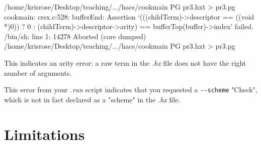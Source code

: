 \documentclass[11pt]{article} %
\begin{document}
\begin{error}[]\leavevmode
\begin{code}
/home/krisrose/Desktop/teaching/.../hacs/cookmain PG pr3.hxt > pr3.pg
cookmain: crsx.c:528: bufferEnd: Assertion
   `(((childTerm)->descriptor == ((void *)0)) ? 0 :
        (childTerm)->descriptor->arity) == bufferTop(buffer)->index' failed.
/bin/sh: line 1: 14278 Aborted
  (core dumped) /home/krisrose/Desktop/teaching/.../hacs/cookmain PG pr3.hxt > pr3.pg
\end{code}
  This indicates an arity error: a raw term in the \emph{.hx} file does not have the right number of
  arguments.
\end{error}

\begin{error}[]\leavevmode
\begin{code}
« $Print-Check[
...
»
\end{code}
This error from your \emph{.run} script indicates that you requested a \verb'--scheme' "Check",
which is not in fact declared as a "scheme" in the \emph{.hx} file.
\end{error}


\section{Limitations}\label{app:limits}
\end{document}
